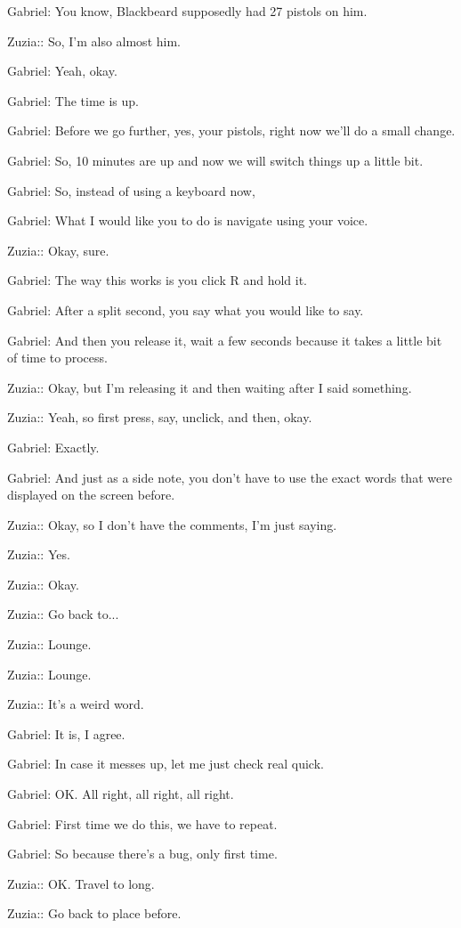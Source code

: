 Gabriel: You know, Blackbeard supposedly had 27 pistols on him.

Zuzia:: So, I'm also almost him.

Gabriel: Yeah, okay.

Gabriel: The time is up.

Gabriel: Before we go further, yes, your pistols, right now we'll do a small change.

Gabriel: So, 10 minutes are up and now we will switch things up a little bit.

Gabriel: So, instead of using a keyboard now,

Gabriel: What I would like you to do is navigate using your voice.

Zuzia:: Okay, sure.

Gabriel: The way this works is you click R and hold it.

Gabriel: After a split second, you say what you would like to say.

Gabriel: And then you release it, wait a few seconds because it takes a little bit of time to process.

Zuzia:: Okay, but I'm releasing it and then waiting after I said something.

Zuzia:: Yeah, so first press, say, unclick, and then, okay.

Gabriel: Exactly.

Gabriel: And just as a side note, you don't have to use the exact words that were displayed on the screen before.

Zuzia:: Okay, so I don't have the comments, I'm just saying.

Zuzia:: Yes.

Zuzia:: Okay.

Zuzia:: Go back to...

Zuzia:: Lounge.

Zuzia:: Lounge.

Zuzia:: It's a weird word.

Gabriel: It is, I agree.

Gabriel: In case it messes up, let me just check real quick.

Gabriel: OK. All right, all right, all right.

Gabriel: First time we do this, we have to repeat.

Gabriel: So because there's a bug, only first time.

Zuzia:: OK. Travel to long.

Zuzia:: Go back to place before.

